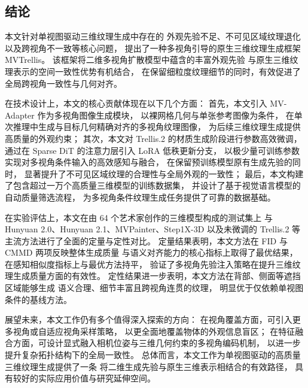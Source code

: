 \subsection{结论}

本文针对单视图驱动三维纹理生成中存在的
外观先验不足、不可见区域纹理退化以及跨视角不一致等核心问题，
提出了一种多视角引导的原生三维纹理生成框架 MVTrellis。
该框架将二维多视角扩散模型中蕴含的丰富外观先验
与原生三维纹理表示的空间一致性优势有机结合，
在保留细粒度纹理细节的同时，有效促进了全局跨视角一致性与几何对齐。

在技术设计上，本文的核心贡献体现在以下几个方面：
首先，本文引入 MV-Adapter 作为多视角图像生成模块，
以裸网格几何与单张参考图像为条件，
在单次推理中生成与目标几何精确对齐的多视角纹理图像，
为后续三维纹理生成提供高质量的外观约束；
其次，本文对 Trellis.2 的材质生成阶段进行参数高效微调，
通过在 Sparse DiT 的注意力层引入 LoRA 低秩更新分支，
以极少量可训练参数实现对多视角条件输入的高效感知与融合，
在保留预训练模型原有生成先验的同时，
显著提升了不可见区域纹理的合理性与全局外观的一致性；
最后，本文构建了包含超过一万个高质量三维模型的训练数据集，
并设计了基于视觉语言模型的自动质量筛选流程，
为多视角条件纹理生成任务提供了可靠的数据基础。

在实验评估上，本文在由 64 个艺术家创作的三维模型构成的测试集上
与 Hunyuan 2.0、Hunyuan 2.1、MVPainter、Step1X-3D
以及未微调的 Trellis.2 等主流方法进行了全面的定量与定性对比。
定量结果表明，本文方法在 FID 与 CMMD 两项反映整体生成质量
与语义对齐能力的核心指标上取得了最优结果，
在感知相似度指标上与最优方法持平，
验证了多视角先验注入策略在提升三维纹理生成质量方面的有效性。
定性结果进一步表明，本文方法在背部、侧面等遮挡区域能够生成
语义合理、细节丰富且跨视角连贯的纹理，
明显优于仅依赖单视图条件的基线方法。

展望未来，本文工作仍有多个值得深入探索的方向：
在视角覆盖方面，可引入更多视角或自适应视角采样策略，
以更全面地覆盖物体的外观信息盲区；
在特征融合方面，可设计显式融入相机位姿与三维几何约束的多视角编码机制，
以进一步提升复杂拓扑结构下的全局一致性。
总体而言，本文工作为单视图驱动的高质量三维纹理生成提供了一条
将二维生成先验与原生三维表示相结合的有效路径，
具有较好的实际应用价值与研究延伸空间。